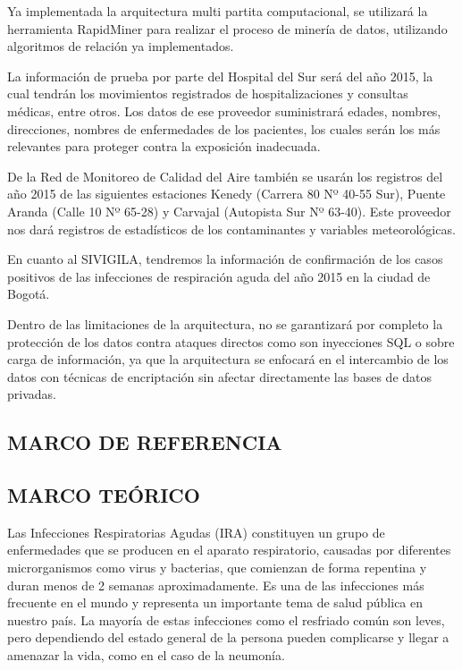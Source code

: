 \documentclass[a4paper, 12pt, oneside]{article}
\theoremstyle{definition}
\theoremstyle{remark}
\begin{document}
Ya implementada la arquitectura multi partita computacional, se utilizará la herramienta RapidMiner para realizar el proceso de minería de datos, utilizando algoritmos de relación ya implementados.

La información de prueba por parte del Hospital del Sur será del año 2015, la cual tendrán los movimientos registrados de hospitalizaciones y consultas médicas, entre otros. Los datos de ese proveedor suministrará edades, nombres, direcciones, nombres de enfermedades de los pacientes, los cuales serán los más relevantes para proteger contra la exposición inadecuada.

De la Red de Monitoreo de Calidad del Aire también se usarán los registros del año 2015 de las siguientes estaciones Kenedy (Carrera 80 Nº 40-55 Sur), Puente Aranda (Calle 10 Nº 65-28) y Carvajal (Autopista Sur Nº 63-40). Este proveedor nos dará registros de estadísticos de los contaminantes y variables meteorológicas.

En cuanto al SIVIGILA, tendremos la información de confirmación de los casos positivos de las infecciones de respiración aguda del año 2015 en la ciudad de Bogotá.

Dentro de las limitaciones de la arquitectura, no se garantizará por completo la protección de los datos contra ataques directos como son inyecciones SQL o sobre carga de información, ya que la arquitectura se enfocará en el intercambio de los datos con técnicas de encriptación sin afectar directamente las bases de datos privadas. 

\begin{center}
 \section{MARCO DE REFERENCIA}
\end{center}

\subsection{MARCO TEÓRICO}


Las Infecciones Respiratorias Agudas (IRA) constituyen un grupo de enfermedades que se producen en el aparato respiratorio, causadas por diferentes microrganismos como virus y bacterias, que comienzan de forma repentina y duran menos de 2 semanas aproximadamente. Es una de las infecciones más frecuente en el mundo y representa un importante tema de salud pública en nuestro país.  La mayoría de estas infecciones como el resfriado común son leves, pero dependiendo del estado general de la persona pueden complicarse y llegar a amenazar la vida, como en el caso de la neumonía.
\end{document}
